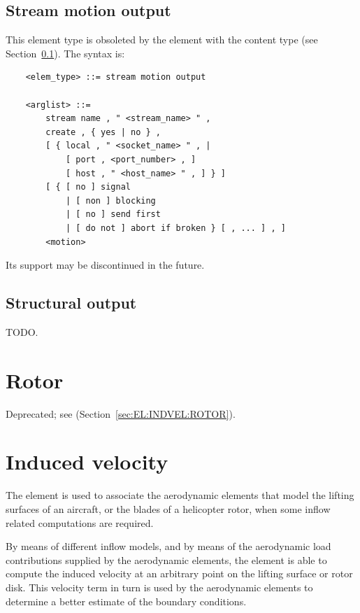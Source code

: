 \subsection{Stream motion output}\label{sec:EL:OUTELEM:STREAM_MOTION_OUTPUT}
This element type is obsoleted by the  element
with the  content type
(see Section~\ref{sec:EL:OUTELEM:STREAM_MOTION_OUTPUT}).
The syntax is:
\begin{verbatim}
    <elem_type> ::= stream motion output

    <arglist> ::= 
        stream name , " <stream_name> " ,
        create , { yes | no } ,
        [ { local , " <socket_name> " , |
            [ port , <port_number> , ]
            [ host , " <host_name> " , ] } ]
        [ { [ no ] signal
            | [ non ] blocking
            | [ no ] send first
            | [ do not ] abort if broken } [ , ... ] , ]
        <motion>
\end{verbatim}
Its support may be discontinued in the future.



\subsection{Structural output}
\label{sec:EL:OUTELEM:STRUCTURAL_OUTPUT}
TODO.




\section{Rotor}
\label{sec:EL:ROTOR}
Deprecated; see  (Section~\ref{sec:EL:INDVEL:ROTOR}).



\section{Induced velocity}
\label{sec:EL:INDVEL}
The  element is used to associate the aerodynamic elements
that model the lifting surfaces of an aircraft,
or the blades of a helicopter rotor, when some inflow related computations 
are required.

By means of different inflow models, and by means
of the aerodynamic load contributions supplied by the aerodynamic elements,
the  element is able to compute the induced velocity
at an arbitrary point on the lifting surface or rotor disk.
This velocity term in turn is used by the aerodynamic elements to determine
a better estimate of the boundary conditions.

